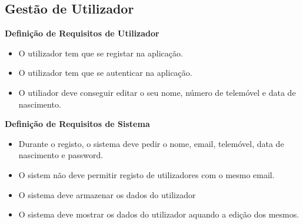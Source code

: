 \documentclass[a4paper]{report}
\begin{document}
        \subsection{Gestão de Utilizador}
            \textbf{Definição de Requisitos de Utilizador}
            \begin{itemize}
                \item O utilizador tem que se registar na aplicação.
                \item O utilizador tem que se autenticar na aplicação.
                \item O utiliador deve conseguir editar o seu nome, número
                de telemóvel e data de nascimento.
            \end{itemize}
            \textbf{Definição de Requisitos de Sistema}
            \begin{itemize}
                \item Durante o registo, o sistema deve pedir o nome, email,
                telemóvel, data de nascimento e password.
                \item O sistem não deve permitir registo de utilizadores com
                o mesmo email.
                \item O sistema deve armazenar os dados do utilizador
                \item O sistema deve mostrar os dados do utilizador aquando
                a edição dos mesmos.
            \end{itemize}
            
\end{document}
